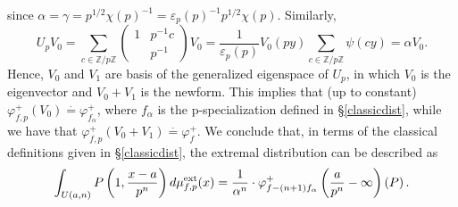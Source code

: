 \documentclass{amsart}
\newcommand{\Z}{{\mathbb Z}}
\begin{document}
since $\alpha=\gamma=p^{1/2}\chi(p)^{-1}=\varepsilon_p(p)^{-1}p^{1/2}\chi(p)$.
Similarly,
\begin{equation}\label{UpV0}
U_p V_0=\sum_{c\in\Z/p\Z}\left(\begin{array}{cc}1&p^{-1}c\\&p^{-1}\end{array}\right)V_0=\frac{1}{\varepsilon_p(p)}V_0(py)\sum_{c\in\Z/p\Z}\psi(cy)=\alpha V_0.%
\end{equation}
Hence, $V_0$ and $V_1$ are basis of the generalized eigenspace of $U_p$, in which $V_0$ is the eigenvector and $V_0+V_1$ is the newform. This implies that (up to constant) $\varphi^+_{f,p}(V_0)\stackrel{\cdot}{=}\varphi^+_{f_\alpha}$, where $f_\alpha$ is the p-specialization defined in \S \ref{classicdist}, while we have that $\varphi^+_{f,p}(V_0+V_1)\stackrel{\cdot}{=}\varphi^+_{f}$. We conclude that, in terms of the classical definitions given in \S \ref{classicdist}, the extremal distribution can be described as
\[
\int_{U(a,n)}P\left(1,\frac{x-a}{p^n}\right)d\mu^{\rm ext}_{f,p}(x)=\frac{1}{\alpha^n}\cdot\varphi^+_{f-(n+1)f_\alpha}\left(\frac{a}{p^n}-\infty\right)\left(P\right).
\]




\end{document}
